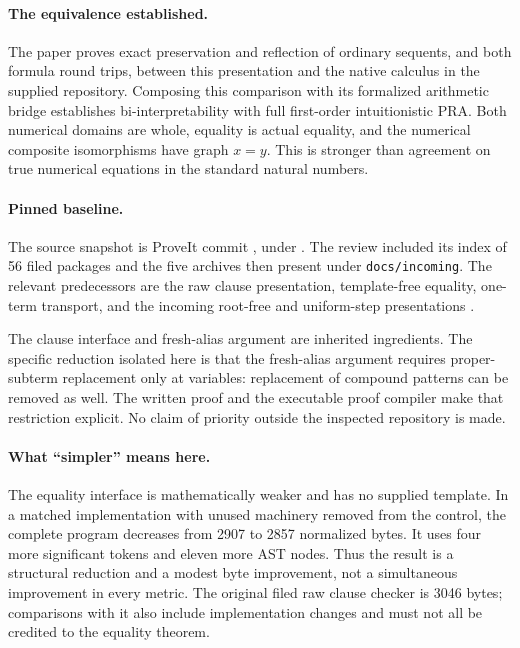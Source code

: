 \documentclass[11pt,letterpaper]{article}
\begin{document}
\paragraph{The equivalence established.}
The paper proves exact preservation and reflection of ordinary sequents,
and both formula round trips, between this presentation and the native
calculus in the supplied repository. Composing this comparison with its
formalized arithmetic bridge establishes bi-interpretability with full
first-order intuitionistic PRA. Both numerical domains are whole, equality
is actual equality, and the numerical composite isomorphisms have graph
$x=y$. This is stronger than agreement on true numerical equations in
the standard natural numbers.

\paragraph{Pinned baseline.}
The source snapshot is ProveIt commit
, under
.
The review included its index of 56 filed packages and the five archives
then present under \texttt{docs/incoming}. The relevant predecessors are
the raw clause presentation, template-free equality, one-term transport,
and the incoming root-free and uniform-step presentations
\cite{index,rawclausal,templatefree,incoming}.

The clause interface and fresh-alias argument are inherited ingredients.
The specific reduction isolated here is that the fresh-alias argument
requires proper-subterm replacement only at variables: replacement of
compound patterns can be removed as well. The written proof and the
executable proof compiler make that restriction explicit. No claim of
priority outside the inspected repository is made.

\paragraph{What ``simpler'' means here.}
The equality interface is mathematically weaker and has no supplied
template. In a matched implementation with unused machinery removed
from the control, the complete program decreases from 2907 to 2857
normalized bytes. It uses four more significant tokens and eleven more
AST nodes. Thus the result is a structural reduction and a modest byte
improvement, not a simultaneous improvement in every metric.
The original filed raw clause checker is 3046 bytes; comparisons with
it also include implementation changes and must not all be credited to
the equality theorem.
\end{document}

